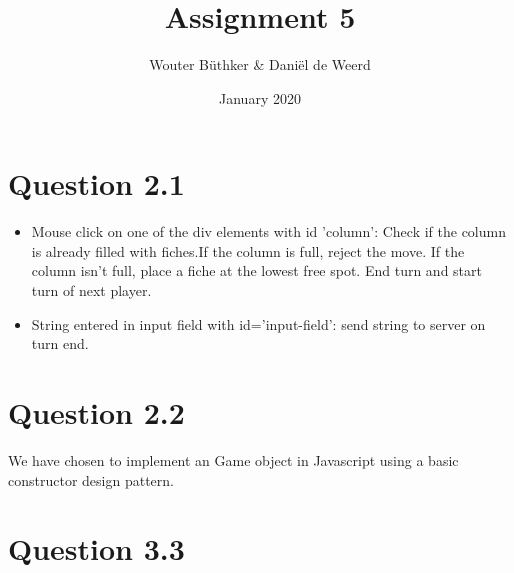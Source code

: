 \documentclass{article}
\title{Assignment 5}
\author{Wouter Büthker & Daniël de Weerd}
\date{January 2020}
\begin{document}
    \maketitle

    \section{Question 2.1}\label{sec:question-2.1}
    \begin{itemize}
        \item Mouse click on one of the div elements with id 'column': Check if the column is already filled with fiches.If the column is full, reject the move. If the column isn't full, place a fiche at the lowest free spot. End turn and start turn of next player.
        \item String entered in input field with id='input-field': send string to server on turn end.
    \end{itemize}
    \section{Question 2.2}\label{sec:question-2.2}
    We have chosen to implement an Game object in Javascript using a basic constructor design pattern.
    \section{Question 3.3}\label{sec:question-3.3}
\end{document}

